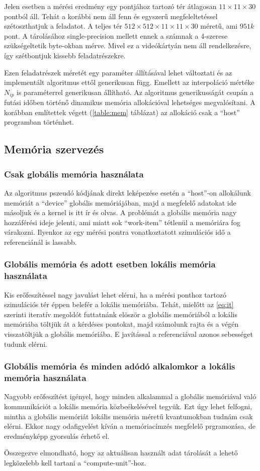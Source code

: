 	Jelen esetben a mérési eredmény egy pontjához tartozó tér átlagosan
	$11\times11\times30$ pontból áll.
	Tehát a korábbi nem áll fenn és egyszerű megfeleltetéssel szétoszthatjuk a
	feladatot.
	A teljes tér $512\times512\times11\times11\times30$ méretű, ami $951k$ pont.
	A tárolásához single-precision mellett ennek a számnak a 4-szerese
	szükségeltetik byte-okban mérve. Mivel ez a videókártyán nem áll
	rendelkezésre, így szétbontjuk kissebb feladatrészekre.
	
	Ezen feladatrészek méretét egy paraméter állításával lehet változtati és az
	implementált algoritmus ettől generikusan függ.
	Emellett az interpoláció mértéke $N_{ip}$ is paraméterrel generikusan állítható.
	Az algoritmus generikusságát csupán a futási időben történő dinamikus memória
	allokációval lehetséges megvalósítani. A korábban említettek végett (\ref{table:mem} táblázat)
	az allokáció csak a ``host'' programban történhet.

\subsection{Memória szervezés}
	\subsubsection{Csak globális memória használata}
	Az algoritmus pszeudó kódjának direkt leképezése esetén a ``host''-on
	allokálunk memóriát a ``device'' globális memóriájában,
	majd a megfelelő adatokat ide másoljuk és a kernel is itt ír és olvas.
	A problémát a globális memória nagy hozzáférési ideje jelenti, ami miatt sok
	``work-item'' tétlenül a memóriára fog várakozni.
	Ilyenkor az egy mérési pontra vonatkoztatott szimulációs idő a
	referenciánál is lassabb.
	\subsubsection{Globális memória és adott esetben lokális memória használata}
	Kis erőfeszítéssel nagy javulást lehet elérni, ha a mérési ponthoz tartozó
	szimulációs tér éppen belefér a lokális memóriába.
	Tehát, mielőtt az \eqref{eq:it} szerinti iteratív megoldót futtatnánk elöször a
	globális memóriából a lokális memóriába töltjük át a kérdéses pontokat, majd
	számolunk rajta és a végén visszatöltjük a globális memóriába.
	E javítással a referenciával azonos sebességet tudunk elérni.
	\subsubsection{Globális memória és minden adódó alkalomkor a lokális memória használata}
	Nagyobb erőfeszítést igényel, hogy minden alkalammal a globális memóriával való kommunikációt a
	lokális memória közbeékelésével tegyük.
	Ezt úgy lehet felfogni, mintha a globális memóriát lokális memória méretű
	kvantumokban tudnám csak elérni.
	Ekkor nagy odafigyelést kíván a memóriacímzés megfelelő prgramozása, de
	eredményképp gyorsulás érhető el. \\
	
	\noindent
	\begin{center}
	Összegezve elmondható, hogy az aktuálisan használt adat tárolását a lehető
	legközelebb kell tartani a ``compute-unit''-hoz.
	\end{center}